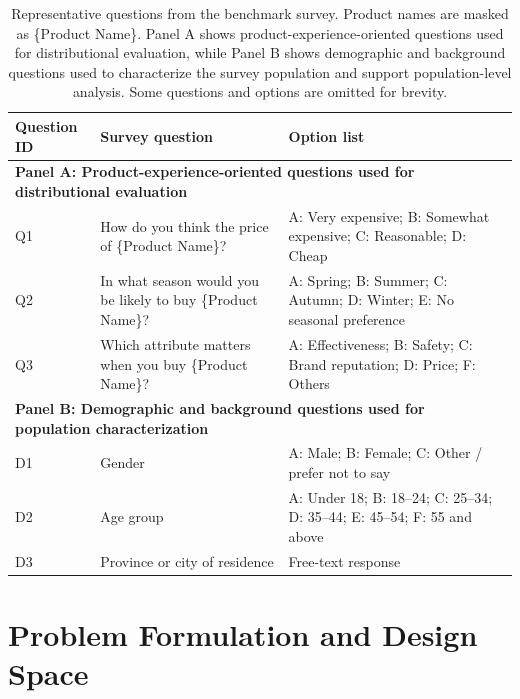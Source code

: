 \documentclass{article}
\begin{document}
\begin{table}[htb!]
\centering
\small
\begin{tabular}{p{}p{}p{}}
\toprule
Question ID & Survey question & Option list \\
\midrule
\multicolumn{3}{l}{\textbf{Panel A: Product-experience-oriented questions used for distributional evaluation}} \\
\midrule
Q1 &
How do you think the price of \{Product Name\}? &
A: Very expensive; B: Somewhat expensive; C: Reasonable; D: Cheap \\

Q2 &
In what season would you be likely to buy \{Product Name\}? &
A: Spring; B: Summer; C: Autumn; D: Winter; E: No seasonal preference \\

Q3 &
Which attribute matters when you buy \{Product Name\}? &
A: Effectiveness; B: Safety; C: Brand reputation; D: Price; F: Others \\

\midrule
\multicolumn{3}{l}{\textbf{Panel B: Demographic and background questions used for population characterization}} \\
\midrule
D1 &
Gender &
A: Male; B: Female; C: Other / prefer not to say \\

D2 &
Age group &
A: Under 18; B: 18--24; C: 25--34; D: 35--44; E: 45--54; F: 55 and above \\

D3 &
Province or city of residence &
Free-text response \\

\bottomrule
\end{tabular}
\caption{Representative questions from the benchmark survey. Product names are masked as \{Product Name\}. Panel A shows product-experience-oriented questions used for distributional evaluation, while Panel B shows demographic and background questions used to characterize the survey population and support population-level analysis. Some questions and options are omitted for brevity.}
\label{tab:questions}
\end{table}

\section{Problem Formulation and Design Space}
\label{sec:problem}
\end{document}
